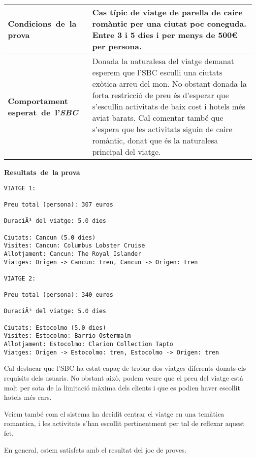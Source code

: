 \documentclass[11pt,a4paper]{article}
\begin{document}
\noindent
\begin{tabular}{|p{}|p{}|}
\hline
\textbf{\mbox{Condicions de la} \mbox{prova}} & Cas típic de viatge de parella de caire romàntic per una ciutat poc coneguda. Entre 3 i 5 dies i per menys de 500\euro{} per persona.\\
\hline
\textbf{Comportament \mbox{esperat de l'\emph{SBC}}} & Donada la naturalesa del viatge demanat esperem que l'SBC esculli una ciutats exòtica arreu del mon. No obstant donada la forta restricció de preu és d'esperar que s'escullin activitats de baix cost i hotels més aviat barats. Cal comentar també que s'espera que les activitats siguin de caire romàntic, donat que és la naturalesa principal del viatge. \\
\hline
\end{tabular}
\bigskip
\textbf{\mbox{Resultats de la} \mbox{prova}}\begin{lstlisting}
VIATGE 1:

Preu total (persona): 307 euros

DuraciÃ³ del viatge: 5.0 dies

Ciutats: Cancun (5.0 dies)
Visites: Cancun: Columbus Lobster Cruise
Allotjament: Cancun: The Royal Islander
Viatges: Origen -> Cancun: tren, Cancun -> Origen: tren

VIATGE 2:

Preu total (persona): 340 euros

DuraciÃ³ del viatge: 5.0 dies

Ciutats: Estocolmo (5.0 dies)
Visites: Estocolmo: Barrio Ostermalm
Allotjament: Estocolmo: Clarion Collection Tapto
Viatges: Origen -> Estocolmo: tren, Estocolmo -> Origen: tren

\end{lstlisting}
\medskip

Cal destacar que l'SBC ha estat capaç de trobar dos viatges diferents donats els requisits dels usuaris. No obstant això, podem veure que el preu del viatge està molt per sota de la limitació màxima dels clients i que es podien haver escollit hotels més cars.

Veiem també com el sistema ha decidit centrar el viatge en una temàtica romantica, i les activitats s'han escollit pertinentment per tal de reflexar aquest fet.

En general, estem satisfets amb el resultat del joc de proves.


\end{document}
